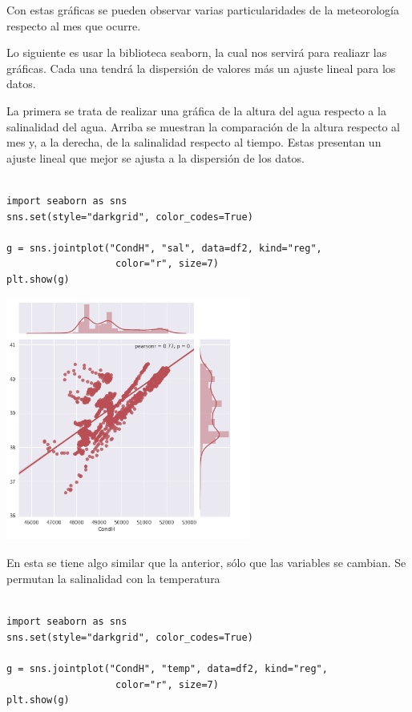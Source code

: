 \documentclass{article}
\begin{document}
Con estas gráficas se pueden observar varias particularidades de la meteorología respecto al mes que ocurre.

Lo siguiente es usar la biblioteca seaborn, la cual nos servirá para realiazr las gráficas. Cada una tendrá la dispersión de valores más un ajuste lineal para los datos.

La primera se trata de realizar una gráfica de la altura del agua respecto a la salinalidad del agua. Arriba se muestran la comparación de la altura respecto al mes y, a la derecha, de la salinalidad respecto al tiempo. Estas presentan un ajuste lineal que mejor se ajusta a la dispersión de los datos.
\begin{verbatim}

import seaborn as sns
sns.set(style="darkgrid", color_codes=True)

g = sns.jointplot("CondH", "sal", data=df2, kind="reg",
                   color="r", size=7)
plt.show(g)

\end{verbatim}


\begin{center}

\includegraphics[width=8cm, height=8cm]{lin1.png}

\end{center}

En esta se tiene algo similar que la anterior, sólo que las variables se cambian. Se permutan la salinalidad con la temperatura
\begin{verbatim}

import seaborn as sns
sns.set(style="darkgrid", color_codes=True)

g = sns.jointplot("CondH", "temp", data=df2, kind="reg",
                   color="r", size=7)
plt.show(g)

\end{verbatim}
\end{document}
